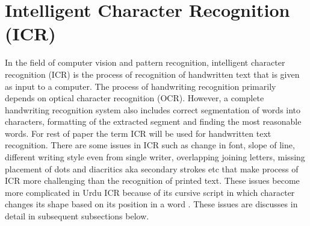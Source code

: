 \documentclass[a4paper,conference]{IEEEtran}
\begin{document}
\section{Intelligent Character Recognition (ICR)} \label{ICR}
In the field of computer vision and pattern recognition, intelligent character recognition (ICR) is the process of recognition of handwritten text that is given as input to a computer.  The process of handwriting recognition primarily depends on optical character recognition (OCR). However, a complete handwriting recognition system also includes correct segmentation of words into characters, formatting of the extracted segment and finding the most reasonable words. For rest of paper the term ICR will be used for handwritten text recognition. There are some issues in ICR such as  change in font, slope of line, different writing style even from single writer, overlapping joining letters, missing placement of dots and diacritics aka secondary strokes etc that make process of ICR more challenging than the recognition of printed text. These issues become more complicated in Urdu ICR because of its cursive script in which character changes its shape based on its position in a word \cite{3}. These issues are discusses in detail in subsequent subsections below. \\
\end{document}
